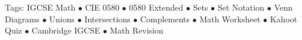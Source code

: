 \documentclass[11pt,a4paper]{article}
\begin{document}
\vspace{14pt}
\begin{center}
  \sffamily\scriptsize\textcolor{textmuted}{
    Tags: IGCSE Math $\bullet$ CIE 0580 $\bullet$ 0580 Extended $\bullet$ Sets $\bullet$ Set Notation $\bullet$ Venn Diagrams $\bullet$ Unions $\bullet$ Intersections $\bullet$ Complements $\bullet$ Math Worksheet $\bullet$ Kahoot Quiz $\bullet$ Cambridge IGCSE $\bullet$ Math Revision
  }
\end{center}
\end{document}
